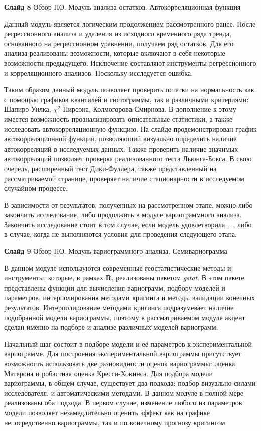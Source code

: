 \documentclass[a4paper,10pt]{report}
\begin{document}
\textbf{Слайд 8} Обзор ПО. Модуль анализа остатков. Автокорреляционная функция

Данный модуль является логическим продолжением рассмотренного ранее. После регрессионного анализа и удаления из исходного временного ряда тренда, основанного на регрессионном уравнении, получаем ряд остатков. Для его анализа реализованы возможности, которые включают в себя некоторые возможности предыдущего. Исключение составляют инструменты регрессионного и корреляционного анализов. Поскольку исследуется ошибка.

Таким образом данный модуль позволяет проверить остатки на нормальность как с помощью графиков квантилей и гистограммы, так и различными критериями: Шапиро-Уилка, $ \chi^2 $-Пирсона, Колмогорова-Смирнова. В дополнение к этому имеется возможность проанализировать описательные статистики, а также исследовать автокорреляционную функцию. На слайде продемонстрирован график автокорреляционной функции, позволяющий визуально определить наличие автокорреляций в исследуемых данных. Также проверить наличие значимых автокорреляций позволяет проверка реализованного теста Льюнга-Бокса. В свою очередь, расширенный тест Дики-Фуллера, также представленный на рассматриваемой странице, проверяет наличие стационарности в исследуемом случайном процессе.

В зависимости от результатов, полученных на рассмотренном этапе, можно либо закончить исследование, либо продолжить в модуле вариограммного анализа. Закончить исследование стоит в том случае, если модель удовлетворила ..., либо в случае, когда не выполняются условия для проведения следующего этапа.

\textbf{Слайд 9} Обзор ПО. Модуль вариограммного анализа. Семивариограмма

В данном модуле используются современные геостатистические методы и инструменты, которые, в рамках \textbf{R}, реализованы пакетом \textit{gstat}. В этом пакете представлены функции для вычисления вариограмм, подбору моделей и параметров, интерполирования методами кригинга и методы валидации конечных результатов. Интерполирование методами кригинга подразумевает наличие подобранной модели вариограммы, поэтому в рассматриваемом модуле акцент сделан именно на подборе и анализе различных моделей вариограмм.

Начальный шаг состоит в подборе модели и её параметров к экспериментальной вариограмме. Для построения экспериментальной вариограммы присутствует возможность использовать две разновидности оценок вариограммы: оценка Матерона и робастная оценка Кресси-Хокинса. Для подбора модели вариограммы, в общем случае, существует два подхода: подбор визуально силами исследователя, и автоматическими методами. В данном модуле в полной мере реализованы оба подхода. В первом случае, изменение любого из параметров модели позволяет незамедлительно оценить эффект как на графике непосредственно вариограммы, так и по конечному прогнозу кригингом.
\end{document}
